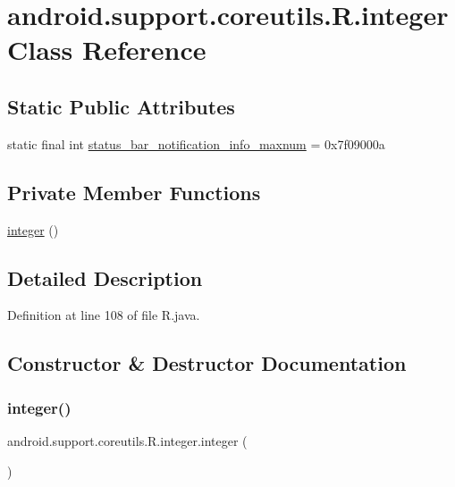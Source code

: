 \hypertarget{classandroid_1_1support_1_1coreutils_1_1_r_1_1integer}{}\section{android.\+support.\+coreutils.\+R.\+integer Class Reference}
\label{classandroid_1_1support_1_1coreutils_1_1_r_1_1integer}
\subsection*{Static Public Attributes}
\begin{DoxyCompactItemize}
\item 
static final int \mbox{\hyperlink{classandroid_1_1support_1_1coreutils_1_1_r_1_1integer_a606a74180704d03d0e19248a38ad09dd}{status\+\_\+bar\+\_\+notification\+\_\+info\+\_\+maxnum}} = 0x7f09000a
\end{DoxyCompactItemize}
\subsection*{Private Member Functions}
\begin{DoxyCompactItemize}
\item 
\mbox{\hyperlink{classandroid_1_1support_1_1coreutils_1_1_r_1_1integer_aa39da8b1c173483abba99d522a0d048b}{integer}} ()
\end{DoxyCompactItemize}


\subsection{Detailed Description}


Definition at line 108 of file R.\+java.



\subsection{Constructor \& Destructor Documentation}
\mbox{\label{classandroid_1_1support_1_1coreutils_1_1_r_1_1integer_aa39da8b1c173483abba99d522a0d048b}} 
\subsubsection{\texorpdfstring{integer()}{integer()}}
{\footnotesize\ttfamily android.\+support.\+coreutils.\+R.\+integer.\+integer (\begin{DoxyParamCaption}{ }\end{DoxyParamCaption})\hspace{0.3cm}{\ttfamily [private]}}



